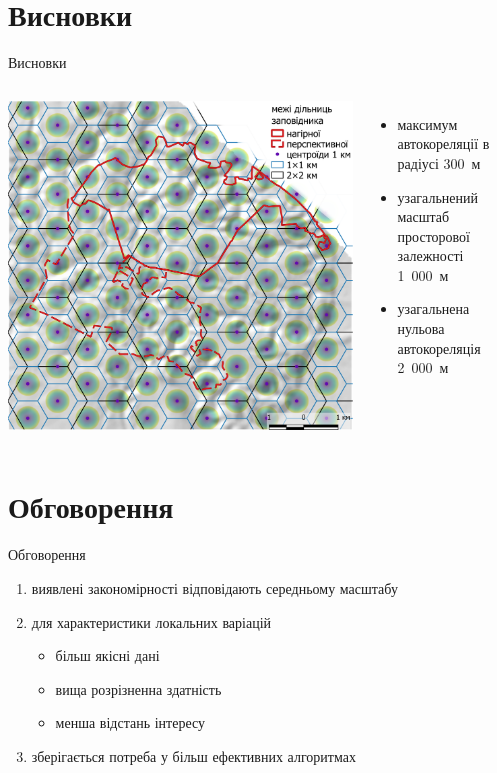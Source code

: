 \documentclass[]{beamer}
\begin{document}
\section{Висновки}

\begin{frame}{Висновки}{}
\begin{columns}[c]
	\includegraphics[width=\textwidth]{./pres_figures/grids_map.png}
	
	\begin{itemize}
		\item максимум автокореляції в радіусі 300~м
		\item узагальнений масштаб просторової залежності 1~000~м
		\item узагальнена нульова автокореляція 2~000~м
	\end{itemize}
\end{columns}
\end{frame}

\section{Обговорення}
\begin{frame}{Обговорення}{}
\begin{enumerate}
	\item виявлені закономірності відповідають середньому масштабу
	\item для характеристики локальних варіацій
	\begin{itemize}
		\item більш якісні дані
		\item вища розрізненна здатність
		\item менша відстань інтересу
	\end{itemize}
	\item зберігається потреба у більш ефективних алгоритмах	
\end{enumerate}	
\end{frame}
\end{document}
